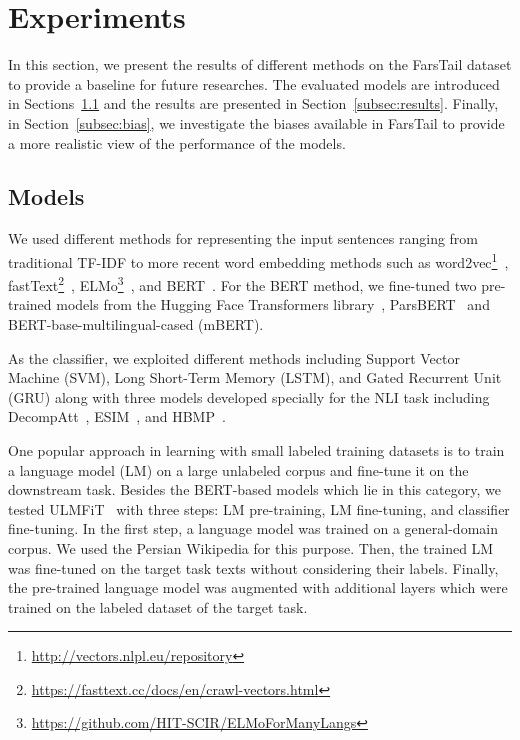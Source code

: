 \documentclass[preprint,12pt]{elsarticle}
\begin{document}
\section{Experiments}
\label{sec:experiments}
In this section, we present the results of different methods on the FarsTail dataset to provide a baseline for future researches. The evaluated models are introduced in Sections~\ref{subsec:models} and the results are presented in Section~\ref{subsec:results}. Finally, in Section~\ref{subsec:bias}, we investigate the biases available in FarsTail to provide a more realistic view of the performance of the models.

\subsection{Models}
\label{subsec:models}
We used different methods for representing the input sentences ranging from traditional TF-IDF to more recent word embedding methods such as word2vec\footnote{\url{http://vectors.nlpl.eu/repository}}~\citep{mikolov2013distributed}, fastText\footnote{\url{https://fasttext.cc/docs/en/crawl-vectors.html}}~\citep{bojanowski2017enriching}, ELMo\footnote{\url{https://github.com/HIT-SCIR/ELMoForManyLangs}}~\citep{peters2018deep}, and BERT~\citep{devlin2018bert}.
For the BERT method, we fine-tuned two pre-trained models from the Hugging Face Transformers library~\citep{wolf2019huggingface}, ParsBERT~\citep{farahani2020parsbert} and BERT-base-multilingual-cased (mBERT).

As the classifier, we exploited different methods including Support Vector Machine (SVM), Long Short-Term Memory (LSTM), and Gated Recurrent Unit (GRU) along with three models developed specially for the NLI task including DecompAtt~\citep{parikh2016decomposable}, ESIM~\citep{chen2016enhanced}, and HBMP~\citep{talman2019sentence}. 

One popular approach in learning with small labeled training datasets is to train a language model (LM) on a large unlabeled corpus and fine-tune it on the downstream task. Besides the BERT-based models which lie in this category, we tested ULMFiT~\citep{howard2018universal} with three steps: LM pre-training, LM fine-tuning, and classifier fine-tuning. In the first step, a language model was trained on a general-domain corpus. We used the Persian Wikipedia for this purpose. Then, the trained LM was fine-tuned on the target task texts without considering their labels. Finally, the pre-trained language model was augmented with additional layers which were trained on the labeled dataset of the target task. 
\end{document}
